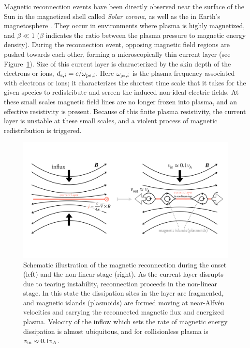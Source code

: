 Magnetic reconnection events have been directly observed near the surface of the Sun in the magnetized shell called \emph{Solar corona}, as well as the in Earth's magnetosphere \citep[for a contemporary review, see, e.g.,][]{2010RvMP...82..603Y}. They occur in environments where plasma is highly magnetized, and $\beta\ll 1$ ($\beta$ indicates the ratio between the plasma pressure to magnetic energy density). During the reconnection event, opposing magnetic field regions are pushed towards each other, forming a microscopically thin current layer (see Figure~\ref{fig:intro-rec}). Size of this current layer is characterized by the skin depth of the electrons or ions, $d_{e,i} = c/\omega_{{\rm p}e,i}$. Here $\omega_{{\rm p}e,i}$ is the plasma frequency associated with electrons or ions; it characterizes the shortest time scale that it takes for the given species to redistribute and screen the induced non-ideal electric fields. At these small scales magnetic field lines are no longer frozen into plasma, and an effective resistivity is present. Because of this finite plasma resistivity, the current layer is unstable at these small scales, and a violent process of magnetic redistribution is triggered.

\begin{figure}[htb]
    \centering
    \includegraphics[width=\textwidth,trim={20 150 20 100},clip]{figures/intro/scheme_reconnection.pdf}
    \caption{Schematic illustration of the magnetic reconnection during the onset (left) and the non-linear stage (right). As the current layer disrupts due to tearing instability, reconnection proceeds in the non-linear stage. In this state the dissipation sites in the layer are fragmented, and magnetic islands (plasmoids) are formed moving at near-Alfv\'en velocities and carrying the reconnected magnetic flux and energized plasma. Velocity of the inflow which sets the rate of magnetic energy dissipation is almost ubiquitous, and for collisionless plasma is $v_{\rm in}\approx 0.1v_{A}$.}
    \label{fig:intro-rec}
\end{figure}

